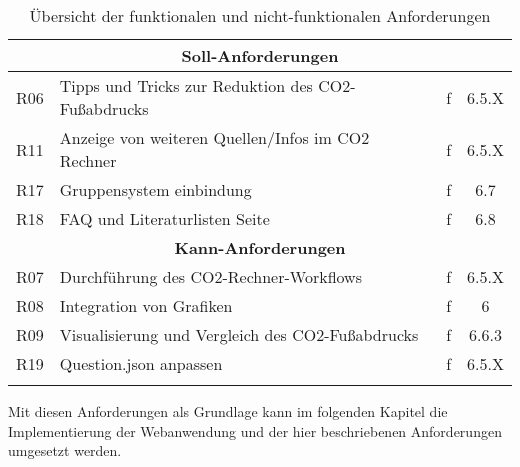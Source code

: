 \begin{longtable}{|c|l|c|c|}
    \multicolumn{4}{|c|}{\textbf{Soll-Anforderungen}}                                      \\ \hline

    R06                  & Tipps und Tricks zur Reduktion des CO2-Fußabdrucks & f  & 6.5.X \\ \hline
    R11                  & Anzeige von weiteren Quellen/Infos im CO2 Rechner  & f  & 6.5.X \\ \hline
    R17                  & Gruppensystem einbindung                           & f  & 6.7   \\ \hline
    R18                  & FAQ und Literaturlisten Seite                      & f  & 6.8   \\ \hline

    \multicolumn{4}{|c|}{\textbf{Kann-Anforderungen}}                                      \\ \hline

    R07                  & Durchführung des CO2-Rechner-Workflows             & f  & 6.5.X \\ \hline
    R08                  & Integration von Grafiken                           & f  & 6     \\ \hline
    R09                  & Visualisierung und Vergleich des CO2-Fußabdrucks   & f  & 6.6.3 \\ \hline
    R19                  & Question.json anpassen                             & f  & 6.5.X \\ \hline
    \caption{Übersicht der funktionalen und nicht-funktionalen Anforderungen}
    \\
\end{longtable}


Mit diesen Anforderungen als Grundlage kann im folgenden Kapitel die Implementierung der Webanwendung und der hier beschriebenen Anforderungen umgesetzt werden.
